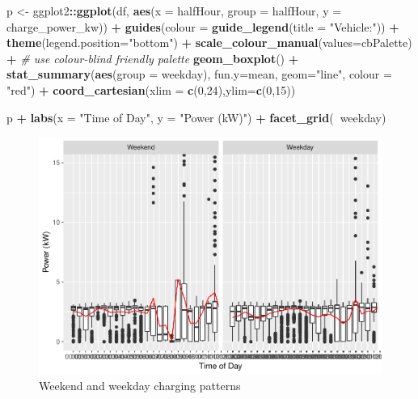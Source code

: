 \documentclass[]{article}
\newenvironment{Shaded}{\begin{snugshade}}{\end{snugshade}}
\newcommand{\KeywordTok}[1]{\textcolor[rgb]{0.13,0.29,0.53}{\textbf{#1}}}
\newcommand{\DataTypeTok}[1]{\textcolor[rgb]{0.13,0.29,0.53}{#1}}
\newcommand{\DecValTok}[1]{\textcolor[rgb]{0.00,0.00,0.81}{#1}}
\newcommand{\StringTok}[1]{\textcolor[rgb]{0.31,0.60,0.02}{#1}}
\newcommand{\CommentTok}[1]{\textcolor[rgb]{0.56,0.35,0.01}{\textit{#1}}}
\newcommand{\OperatorTok}[1]{\textcolor[rgb]{0.81,0.36,0.00}{\textbf{#1}}}
\newcommand{\NormalTok}[1]{#1}
\begin{document}
\begin{Shaded}
\begin{Highlighting}[]
\NormalTok{p <-}\StringTok{ }\NormalTok{ggplot2}\OperatorTok{::}\KeywordTok{ggplot}\NormalTok{(df, }\KeywordTok{aes}\NormalTok{(}\DataTypeTok{x =}\NormalTok{ halfHour, }\DataTypeTok{group =}\NormalTok{ halfHour, }\DataTypeTok{y =}\NormalTok{ charge_power_kw)) }\OperatorTok{+}
\StringTok{  }\KeywordTok{guides}\NormalTok{(}\DataTypeTok{colour =} \KeywordTok{guide_legend}\NormalTok{(}\DataTypeTok{title =} \StringTok{"Vehicle:"}\NormalTok{)) }\OperatorTok{+}
\StringTok{  }\KeywordTok{theme}\NormalTok{(}\DataTypeTok{legend.position=}\StringTok{"bottom"}\NormalTok{) }\OperatorTok{+}
\StringTok{  }\KeywordTok{scale_colour_manual}\NormalTok{(}\DataTypeTok{values=}\NormalTok{cbPalette) }\OperatorTok{+}\StringTok{ }\CommentTok{# use colour-blind friendly palette}
\StringTok{  }\KeywordTok{geom_boxplot}\NormalTok{() }\OperatorTok{+}
\StringTok{  }\KeywordTok{stat_summary}\NormalTok{(}\KeywordTok{aes}\NormalTok{(}\DataTypeTok{group =}\NormalTok{ weekday), }\DataTypeTok{fun.y=}\NormalTok{mean, }\DataTypeTok{geom=}\StringTok{"line"}\NormalTok{, }\DataTypeTok{colour =} \StringTok{"red"}\NormalTok{) }\OperatorTok{+}
\StringTok{  }\KeywordTok{coord_cartesian}\NormalTok{(}\DataTypeTok{xlim =} \KeywordTok{c}\NormalTok{(}\DecValTok{0}\NormalTok{,}\DecValTok{24}\NormalTok{),}\DataTypeTok{ylim=}\KeywordTok{c}\NormalTok{(}\DecValTok{0}\NormalTok{,}\DecValTok{15}\NormalTok{))}

\NormalTok{p }\OperatorTok{+}\StringTok{ }\KeywordTok{labs}\NormalTok{(}\DataTypeTok{x =} \StringTok{"Time of Day"}\NormalTok{, }\DataTypeTok{y =} \StringTok{"Power (kW)"}\NormalTok{) }\OperatorTok{+}\StringTok{ }\KeywordTok{facet_grid}\NormalTok{(}\OperatorTok{~}\NormalTok{weekday) }
\end{Highlighting}
\end{Shaded}

\begin{figure}
\centering
\includegraphics{EVBB_Report_files/figure-latex/plot3-1.pdf}
\caption{\label{fig:plot3}Weekend and weekday charging patterns}
\end{figure}
\end{document}
